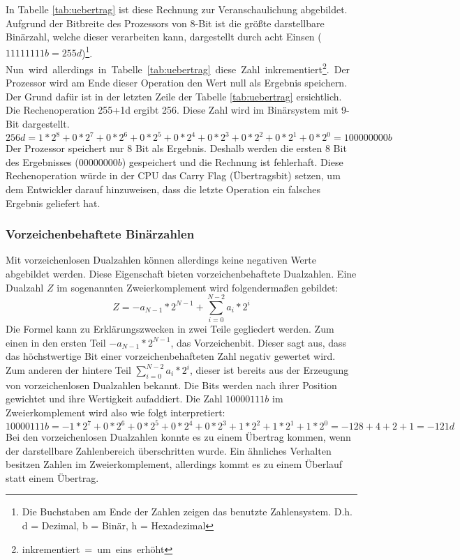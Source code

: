 \documentclass[a4paper,12pt]{article}
\begin{document}
\noindent In Tabelle \ref{tab:uebertrag} ist diese Rechnung zur Veranschaulichung abgebildet. Aufgrund der Bitbreite des Prozessors von 8-Bit ist die größte darstellbare Binärzahl, welche dieser verarbeiten kann, dargestellt durch acht Einsen ($11111111b = 255d$)\footnote{Die Buchstaben am Ende der Zahlen zeigen das benutzte Zahlensystem. D.h. d = Dezimal, b = Binär, h = Hexadezimal}. \mbox{Nun wird allerdings in Tabelle \ref{tab:uebertrag} diese Zahl inkrementiert\footnote{inkrementiert = um eins erhöht}. }Der Prozessor wird am Ende dieser Operation den Wert null als Ergebnis speichern. Der Grund dafür ist in der letzten Zeile der Tabelle \ref{tab:uebertrag} ersichtlich. Die Rechenoperation 255+1d ergibt 256. Diese Zahl wird im Binärsystem mit 9-Bit dargestellt.
$$256d = 1*2^8+0*2^7+0*2^6+0*2^5+0*2^4+0*2^3+0*2^2+0*2^1+0*2^0 = 100000000b$$
Der Prozessor speichert nur 8 Bit als Ergebnis. Deshalb werden die ersten 8 Bit des Ergebnisses ($00000000b$) gespeichert und die Rechnung ist fehlerhaft. Diese Rechenoperation würde in der CPU das Carry Flag (Übertragsbit) setzen, um dem Entwickler darauf hinzuweisen, dass die letzte Operation ein falsches Ergebnis geliefert hat. 
\subsubsection{Vorzeichenbehaftete Binärzahlen}
\noindent Mit vorzeichenlosen Dualzahlen können allerdings keine negativen Werte abgebildet werden. Diese Eigenschaft bieten vorzeichenbehaftete Dualzahlen. Eine Dualzahl $Z$ im sogenannten Zweierkomplement wird folgendermaßen gebildet:
$$Z=-a_{N-1}*2^{N-1}+\sum\limits_{i=0}^{N-2} a_i * 2^i$$
Die Formel kann zu Erklärungszwecken in zwei Teile gegliedert werden. Zum einen in den ersten Teil $-a_{N-1}*2^{N-1}$, das Vorzeichenbit. Dieser sagt aus, dass das höchstwertige Bit einer vorzeichenbehafteten Zahl negativ gewertet wird. Zum anderen der hintere Teil $\sum\limits_{i=0}^{N-2} a_i * 2^i$, dieser ist bereits aus der Erzeugung von vorzeichenlosen Dualzahlen bekannt. Die Bits werden nach ihrer Position gewichtet und ihre Wertigkeit aufaddiert. Die Zahl $10000111b$ im Zweierkomplement wird also wie folgt interpretiert:
$$10000111b = -1*2^7+0*2^6+0*2^5+0*2^4+0*2^3+1*2^2+1*2^1+1*2^0 = -128+4+2+1 = -121d$$
Bei den vorzeichenlosen Dualzahlen konnte es zu einem Übertrag kommen, wenn der darstellbare Zahlenbereich überschritten wurde. Ein ähnliches Verhalten besitzen Zahlen im Zweierkomplement, allerdings kommt es zu einem Überlauf statt einem Übertrag. 
\end{document}
